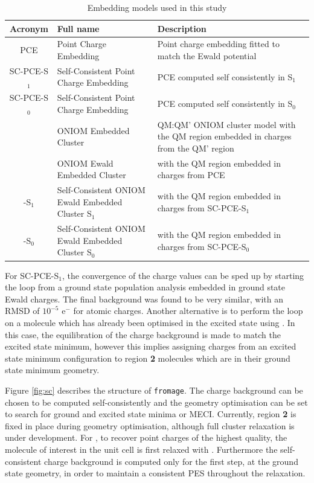 \begin{table}
\centering
\caption{Embedding models used in this study}
\label{tab:acro}
\def\arraystretch{1.5}
\begin{tabular}{cm{6cm}m{6cm}}
\toprule
\textbf{Acronym} & \textbf{Full name} & \textbf{Description}\\\midrule
PCE & Point Charge Embedding & Point charge embedding fitted to match the Ewald potential \\\hdashline
SC-PCE-S$_1$ & Self-Consistent Point Charge Embedding & PCE computed self consistently in S$_1$\\\hdashline
SC-PCE-S$_0$ & Self-Consistent Point Charge Embedding & PCE computed self consistently in S$_0$\\\hdashline
\EC{} & ONIOM Embedded Cluster & QM:QM' ONIOM cluster model with the QM region embedded in charges from the QM' region\\\hdashline
\EEC{} & ONIOM Ewald Embedded Cluster & \EC{} with the QM region embedded in charges from PCE\\\hdashline
\SCEEC{}-S$_1$ & Self-Consistent ONIOM Ewald Embedded Cluster S$_1$ & \EC{} with the QM region embedded in charges from SC-PCE-S$_1$\\\hdashline
\SCEEC{}-S$_0$ & Self-Consistent ONIOM Ewald Embedded Cluster S$_0$ & \EC{} with the QM region embedded in charges from SC-PCE-S$_0$\\\bottomrule
\end{tabular}

\end{table}

For SC-PCE-S$_1$, the convergence of the charge values can be sped up by starting the loop from a ground state population analysis embedded in ground state Ewald charges. The final background was found to be very similar, with an RMSD of $10^{-5}$ $\mathrm{e^-}$ for atomic charges. Another alternative is to perform the loop on a molecule which has already been optimised in the excited state using \EEC{}. In this case, the equilibration of the charge background is made to match the excited state minimum, however this implies assigning charges from an excited state minimum configuration to region \textbf{2} molecules which are in their ground state minimum geometry.




Figure \ref{fig:sc} describes the structure of \texttt{fromage}. The charge background can be chosen to be computed self-consistently and the geometry optimisation can be set to search for ground and excited state minima or MECI. Currently, region \textbf{2} is fixed in place during geometry optimisation, although full cluster relaxation\cite{Ruiz2015} is under development. For \SCEEC{}, to recover point charges of the highest quality, the molecule of interest in the unit cell is first relaxed with \EEC{}. Furthermore the self-consistent charge background is computed only for the first step, at the ground state \EEC{} geometry, in order to maintain a consistent PES throughout the relaxation.

